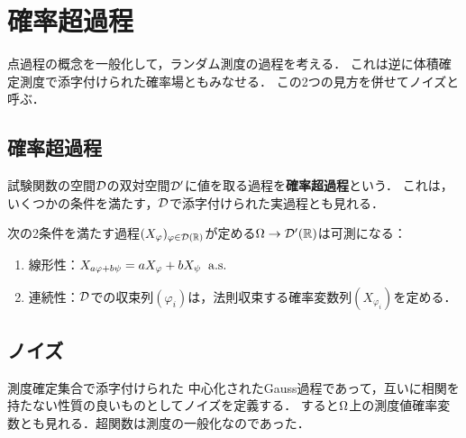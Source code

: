 \documentclass[uplatex,dvipdfmx]{jsreport}
\begin{document}
\section{確率超過程}

\begin{tcolorbox}[colframe=ForestGreen, colback=ForestGreen!10!white,breakable,colbacktitle=ForestGreen!40!white,coltitle=black,fonttitle=\bfseries\sffamily,
title=]
    点過程の概念を一般化して，ランダム測度の過程を考える．
    これは逆に体積確定測度で添字付けられた確率場ともみなせる．
    この2つの見方を併せてノイズと呼ぶ．
\end{tcolorbox}

\subsection{確率超過程}

\begin{tcolorbox}[colframe=ForestGreen, colback=ForestGreen!10!white,breakable,colbacktitle=ForestGreen!40!white,coltitle=black,fonttitle=\bfseries\sffamily,
title=]
    試験関数の空間$\mathcal{D}$の双対空間$\mathcal{D}'$に値を取る過程を\textbf{確率超過程}という．
    これは，いくつかの条件を満たす，$\mathcal{D}$で添字付けられた実過程とも見れる．
\end{tcolorbox}

\begin{lemma}
    次の2条件を満たす過程$(X_\varphi)_{\varphi\in\mathcal{D}(\mathbb{R})}$が定める$\Omega\to\mathcal{D}'(\mathbb{R})$は可測になる：
    \begin{enumerate}
        \item 線形性：$X_{a\varphi+b\psi}=aX_\varphi+bX_\psi\;\;\mathrm{a.s.}$
        \item 連続性：$\mathcal{D}$での収束列$(\varphi_i)$は，法則収束する確率変数列$(X_{\varphi_i})$を定める．
    \end{enumerate}
\end{lemma}

\subsection{ノイズ}

\begin{tcolorbox}[colframe=ForestGreen, colback=ForestGreen!10!white,breakable,colbacktitle=ForestGreen!40!white,coltitle=black,fonttitle=\bfseries\sffamily,
title=]
    測度確定集合で添字付けられた
    中心化されたGauss過程であって，互いに相関を持たない性質の良いものとしてノイズを定義する．
    すると$\Omega$上の測度値確率変数とも見れる．超関数は測度の一般化なのであった．
\end{tcolorbox}
\end{document}
